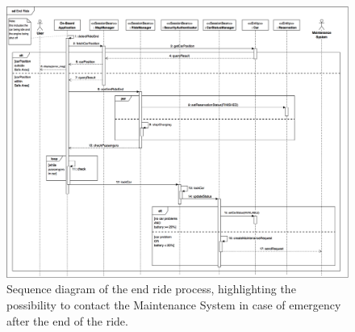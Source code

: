 \begin{figure}[H]
\begin{center}
		\includegraphics[width=\textwidth]{./arch_design/diagrams/end_ride_sd.png}
		\caption{Sequence diagram of the end ride process, highlighting the possibility to contact the Maintenance System in case of emergency after the end of the ride.}
		\label{end_ride_sd}
\end{center}
\end{figure}